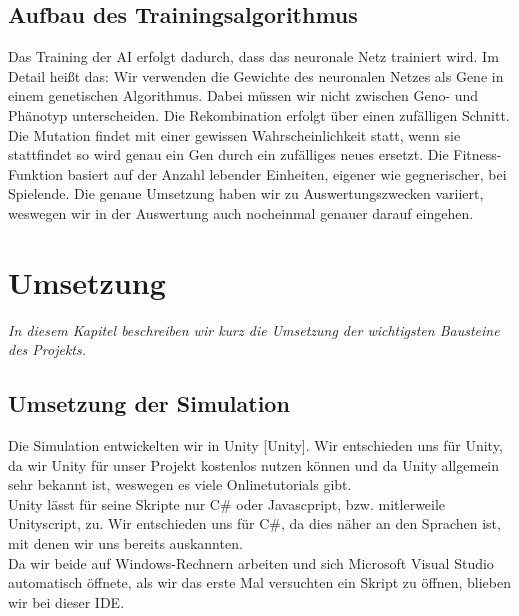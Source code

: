 \documentclass[
	12pt,
	a4paper,
	BCOR10mm,
	DIV14,
	headsepline,
	usegeometry,
]{scrreprt}
\begin{document}
\section{Aufbau des Trainingsalgorithmus}
Das Training der AI erfolgt dadurch, dass das neuronale Netz trainiert wird. Im Detail heißt das: Wir verwenden die Gewichte des neuronalen Netzes als Gene in einem genetischen Algorithmus. Dabei müssen wir nicht zwischen Geno- und Phänotyp unterscheiden. Die Rekombination erfolgt über einen zufälligen Schnitt. Die Mutation findet mit einer gewissen Wahrscheinlichkeit statt, wenn sie stattfindet so wird genau ein Gen durch ein zufälliges neues ersetzt.
Die Fitness-Funktion basiert auf der Anzahl lebender Einheiten, eigener wie gegnerischer, bei Spielende. Die genaue Umsetzung haben wir zu Auswertungszwecken variiert, weswegen wir in der Auswertung auch nocheinmal genauer darauf eingehen.

\chapter{Umsetzung}
\label{Umsetzung}

\textit{%
In diesem Kapitel beschreiben wir kurz die Umsetzung der wichtigsten Bausteine des Projekts.
}

\bigskip

\section{Umsetzung der Simulation}
Die Simulation entwickelten wir in Unity [Unity]. Wir entschieden uns für Unity, da wir Unity für unser Projekt kostenlos nutzen können und da Unity allgemein sehr bekannt ist, weswegen es viele Onlinetutorials gibt.\\
Unity lässt für seine Skripte nur C\# oder Javascpript, bzw. mitlerweile Unityscript, zu. Wir entschieden uns für C\#, da dies näher an den Sprachen ist, mit denen wir uns bereits auskannten.\\
Da wir beide auf Windows-Rechnern arbeiten und sich Microsoft Visual Studio automatisch öffnete, als wir das erste Mal versuchten ein Skript zu öffnen, blieben wir bei dieser IDE.
\end{document}
